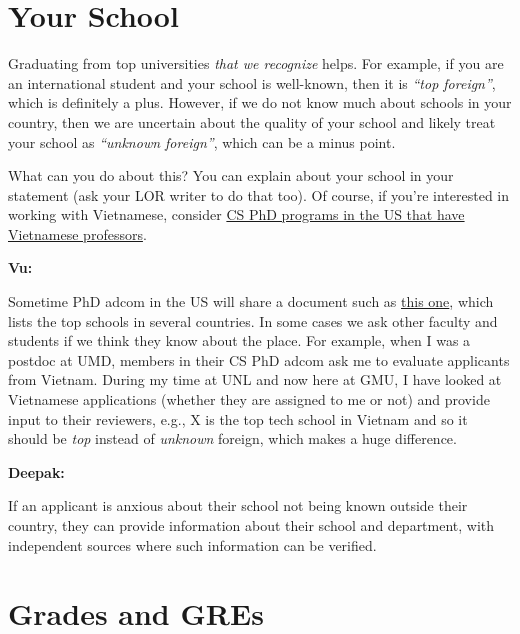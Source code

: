 \documentclass[oneside,11pt]{memoir}
\newenvironment{commentbox}[1][]{
  \small
  \begin{mybox}
    {\small \textbf{#1}}
  }{
  \end{mybox}
}
\begin{document}
\section{Your School}\label{sec:your-school}

Graduating from top universities \emph{that we recognize} helps. For example, if you are an international student and your school is well-known, then it is \emph{``top foreign''}, which is definitely a plus.
However, if we do not know much about schools in your country, then we are uncertain about the quality of your school and  likely treat your school as \emph{``unknown foreign''}, which can be a minus point.


What can you do about this? You can explain about your school in your statement (ask your LOR writer to do that too). Of course, if you're interested in working with Vietnamese, consider  \href{https://github.com/dynaroars/dynaroars.github.io/wiki/Viet-CS-Profs-US}{CS PhD programs in the US that have Vietnamese professors}. %

\begin{commentbox}[Vu:]
  Sometime PhD adcom in the US will share a document such as \href{https://github.com/dynaroars/dynaroars.github.io/wiki/Foreign-Top-Schools}{this one}, which lists the top schools in several countries. In some cases we ask other faculty and students if we think they know about the place.  For example, when I was a postdoc at UMD, members in their CS PhD adcom ask me to evaluate applicants from Vietnam.  During my time at UNL and now here at GMU, I have looked at Vietnamese applications (whether they are assigned to me or not) and provide input to their reviewers, e.g., X is the top tech school in Vietnam and so it should be \emph{top} instead of \emph{unknown} foreign, which makes a huge difference.
\end{commentbox}
\begin{commentbox}[Deepak:] 
  If an applicant is anxious about their school not being known outside their country, they can provide information about their school and department, with independent sources where such information can be verified.
\end{commentbox}

\section{Grades and GREs}\label{sec:grades}
\end{document}
